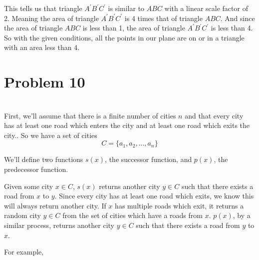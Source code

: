 \documentclass[12pt]{article}
\begin{document}
This tells us that triangle $A^\prime B^\prime C^\prime$ is similar to $ABC$ with a linear scale factor of 2. Meaning the area of triangle $A^\prime B^\prime C^\prime$ is 4 times that of triangle $ABC$. And since the area of triangle $ABC$ is less than 1, the area of triangle $A^\prime B^\prime C^\prime$ is less than 4. So with the given conditions, all the points in our plane are on or in a triangle with an area less than 4.


\newpage
\section*{Problem 10}
\\

First, we'll assume that there is a finite number of cities $n$ and that every city has at least one road which enters the city and at least one road which exits the city.. So we have a set of cities
\[C = \{a_1, a_2, \dots, a_n\}\]

We'll define two functions $s(x)$, the successor function, and $p(x)$, the predecessor function.

Given some city $x \in C$, $s(x)$ returns another city $y \in C$ such that there exists a road from $x$ to $y$. Since every city has at least one road which exits, we know this will always return another city. If $x$ has multiple roads which exit, it returns a random city $y \in C$ from the set of cities which have a roads from $x$. $p(x)$, by a similar process, returns another city $y \in C$ such that there exists a road from $y$ to $x$. 

For example,

\begin{center}
\end{center}
\end{document}
